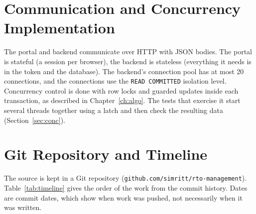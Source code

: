 \section{Communication and Concurrency Implementation}
The portal and backend communicate over HTTP with JSON bodies. The portal is
stateful (a session per browser), the backend is stateless (everything it needs is in the
token and the database). The backend's connection pool has at most 20 connections, and the
connections use the \texttt{READ COMMITTED} isolation level. Concurrency control is done with
row locks and guarded updates inside each transaction, as described in
Chapter~\ref{ch:algo}. The tests that exercise it start several threads together using a
latch and then check the resulting data (Section~\ref{sec:conc}).

\section{Git Repository and Timeline}\label{sec:timeline}
The source is kept in a Git repository (\texttt{github.com/simritt/rto-management}).
Table~\ref{tab:timeline} gives the order of the work from the commit history. Dates are
commit dates, which show when work was pushed, not necessarily when it was written.

